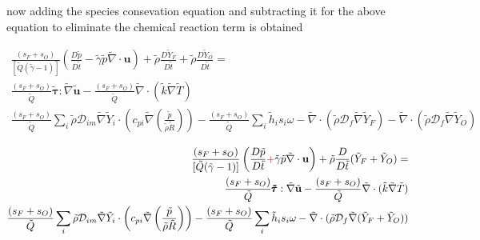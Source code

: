 \documentclass[preprint,12pt,authoryear]{elsarticle}
\begin{document}
now adding the species consevation equation and subtracting it for the above equation to 
eliminate the chemical reaction term is obtained  

\begin{equation}
\begin{split}
	\frac{(s_F+s_O)}{[\tilde{Q}(\tilde{\gamma}-1)]}
	\left(
        	\frac{D \tilde{p}}{D\tilde{t}}
		-
		\tilde{\gamma}
		\tilde{p} 
		\tilde{\nabla}\cdot{\mathbf{u}}
	\right)
	+
	\tilde{\rho} \frac{D  \tilde{Y}_F }{D \tilde{t}}
	+
	\tilde{\rho} \frac{D  \tilde{Y}_O }{D \tilde{t}}
        =
	\\
	\frac{(s_F+s_O)}{\tilde{Q}}
        \pmb{\tilde{\tau}}:\tilde{\nabla} \tilde{\mathbf{u}} 
        - 
	\frac{(s_F+s_O)}{\tilde{Q}}
        \tilde{\nabla} \cdot (\tilde{k}\tilde{\nabla} \tilde{T})
	\\
	\frac{(s_F+s_O)}{\tilde{Q}}
        \sum\limits_i 
        \tilde{\rho}
        \mathcal{D}_{im}
        \tilde{\nabla}
        \tilde{Y}_i     
        \cdot
        \left(
                c_{pi}
                \tilde{\nabla}
                \left(
                	\frac{\tilde{p}}{\tilde{\rho}\tilde{R}}
                \right)
        \right)
	-
	\frac{(s_F+s_O)}{\tilde{Q}}
        \sum\limits_i
	\tilde{h}_i
        s_i \omega	
	-
	\tilde{\nabla}\cdot( \tilde{\rho} \mathcal{D}_f\tilde{\nabla} \tilde{Y}_F)
	-
	\tilde{\nabla}\cdot( \tilde{\rho} \mathcal{D}_f\tilde{\nabla} \tilde{Y}_O)
\end{split}
\end{equation}

\begin{equation}
\begin{split}
	\frac{(s_F+s_O)}{[\tilde{Q}(\tilde{\gamma}-1)]}
	\left(
        	\frac{D \tilde{p}}{D\tilde{t}}
		\textcolor{red}{+}
		\tilde{\gamma}
		\tilde{p} 
		\tilde{\nabla}\cdot{\mathbf{u}}
	\right)
	+
	\tilde{\rho} \frac{D  }{D \tilde{t}}(\tilde{Y}_F+\tilde{Y}_O)
        =
	\\
	\frac{(s_F+s_O)}{\tilde{Q}}
        \pmb{\tilde{\tau}}:\tilde{\nabla} \tilde{\mathbf{u}} 
        - 
	\frac{(s_F+s_O)}{\tilde{Q}}
        \tilde{\nabla} \cdot (\tilde{k}\tilde{\nabla} \tilde{T})
	\\
	\frac{(s_F+s_O)}{\tilde{Q}}
        \sum\limits_i 
        \tilde{\rho}
        \mathcal{D}_{im}
        \tilde{\nabla}
        \tilde{Y}_i     
        \cdot
        \left(
                c_{pi}
                \tilde{\nabla}
                \left(
                	\frac{\tilde{p}}{\tilde{\rho}\tilde{R}}
                \right)
        \right)
	-
	\frac{(s_F+s_O)}{\tilde{Q}}
        \sum\limits_i
	\tilde{h}_i
        s_i \omega	
	-
	\tilde{\nabla}\cdot( \tilde{\rho} \mathcal{D}_f\tilde{\nabla} (\tilde{Y}_F+\tilde{Y}_O))
\end{split}
\end{equation}
\end{document}
